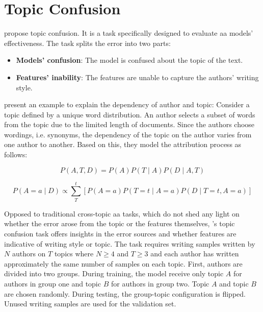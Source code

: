 \section{Topic Confusion}
\label{sec:topic_confusion}

\citet{altakrori_topic_2021} propose topic confusion.
It is a task specifically designed to evaluate \ac{aa} models' effectiveness.
The task splits the error into two parts:
\begin{itemize}
    \item \textbf{Models' confusion}: The model is confused about the topic of the text.
    \item \textbf{Features' inability}: The features are unable to capture the authors' writing style.
\end{itemize}

\citet{altakrori_topic_2021} present an example to explain the dependency of author and topic:
Consider a topic defined by a unique word distribution.
An author selects a subset of words from the topic due to the limited length of documents.
Since the authors choose wordings, i.e. synonyms, the dependency of the topic on the author varies from one author to another.
Based on this, they model the attribution process as follows:

\begin{equation}
    \label{eq:topic_confusion_model_world}
    P(A,T,D) = P(A) P(T \mid A)P(D\mid A,T)
\end{equation}

\begin{equation}
    \label{eq:topic_confusion_attribution_process}
    P(A=a \mid D) \propto \sum_{T}^{t}\left[ P(A=a) P(T=t \mid A = a)P(D\mid T=t,A=a) \right]
\end{equation}

Opposed to traditional cross-topic \ac{aa} tasks, 
which do not shed any light on whether the error arose from the topic or the features themselves, 
\citet{altakrori_topic_2021}'s topic confusion task offers insights in the error sources and 
whether features are indicative of writing style or topic.
The task requires writing samples written by $N$ authors on $T$ topics where $N \geq 4$ and $T \geq 3$ and 
each author has written approximately the same number of samples on each topic.
First, authors are divided into two groups.
During training, the model receive only topic $A$ for authors in group one and topic $B$ for authors in group two.
Topic $A$ and topic $B$ are chosen randomly.
During testing, the group-topic configuration is flipped.
Unused writing samples are used for the validation set.

